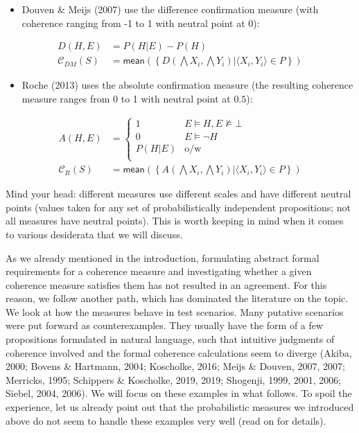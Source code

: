 \documentclass[
  10pt,
]{scrartcl}
\providecommand{\tightlist}{%
  \setlength{\itemsep}{0pt}\setlength{\parskip}{0pt}}
\begin{document}
\begin{itemize}
\tightlist
\item
  Douven \& Meijs (2007) use the difference confirmation measure (with coherence ranging from -1 to 1 with neutral point at 0):
\end{itemize}

\begin{align}
    D(H,E) &= P(H|E) - P(H) \nonumber \\
\tag{DM}  
    \mathcal{C}_{DM}(S) & =
\mathsf{mean}\left(\left\{D(\bigwedge X_i, \bigwedge Y_i) | \langle X_i, Y_i\rangle \in P\right\} \right)
\end{align}

\begin{itemize}
\tightlist
\item
  Roche (2013) uses the absolute confirmation measure
  (the resulting coherence measure ranges from 0 to 1 with neutral point at \(0.5\)):
\end{itemize}

\begin{align} \nonumber 
    A(H,E)  & = \begin{cases}
    1 & E\models H, E\not \models \bot \\
    0 & E \models \neg H\\
    P(H|E) & \mbox{o/w} \\
    \end{cases} \\
\tag{Roche}  
    \mathcal{C}_{R}(S) & =
\mathsf{mean}\left(\left\{A(\bigwedge X_i, \bigwedge Y_i) | \langle X_i, Y_i\rangle \in P\right\} \right) 
\end{align}

Mind your head: different measures use different scales and have different neutral points (values taken for any set of probabilistically independent propositions; not all measures have neutral points). This is worth keeping in mind when it comes to various desiderata that we will discuss.

As we already mentioned in the introduction, formulating abstract formal requirements for a coherence measure and investigating whether a given coherence measure satisfies them has not resulted in an agreement. For this reason, we follow another path, which has dominated the literature on the topic. We look at how the measures behave in test scenarios. Many putative scenarios were put forward as counterexamples. They usually have the form of a few propositions formulated in natural language, such that intuitive judgments of coherence involved and the formal coherence calculations seem to diverge (Akiba, 2000; Bovens \& Hartmann, 2004; Koscholke, 2016; Meijs \& Douven, 2007, 2007; Merricks, 1995; Schippers \& Koscholke, 2019, 2019; Shogenji, 1999, 2001, 2006; Siebel, 2004, 2006). We will focus on these examples in what follows. To spoil the experience, let us already point out that the probabilistic measures we introduced above do not seem to handle these examples very well (read on for details).
\end{document}
